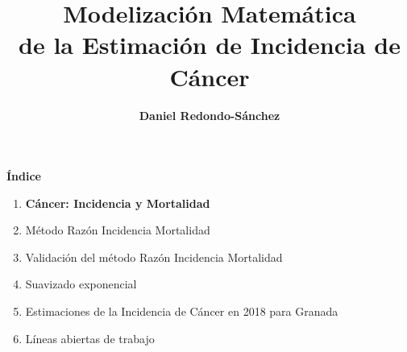 \documentclass{beamer}
\title[Modelización de la Estimación de Cáncer]{Modelización Matemática\\ de la Estimación de Incidencia de Cáncer} %
\author[Daniel Redondo-Sánchez]{\textbf{Daniel Redondo-Sánchez}}
\date[11 Julio 2019]{}
\institute[] %
{\scriptsize{
\vspace{10pt}
Máster Universitario en Matemáticas\\ Curso 2018/2019\\
\vspace{10pt}
Tutores: \newline \textbf{Francisco Javier Alonso Morales} \newline \textbf{Miguel Rodríguez Barranco}

}
\vspace{0pt}

\begin{columns}
	\begin{column}{0.17\textwidth}
		\begin{figure}
			\centering
			\texttt{[image: logos/mm.pdf]}
		\end{figure}
	\end{column}
	\begin{column}{0.5\textwidth}
		\begin{figure}
			\centering
			\texttt{[image: logos/logougr.png]}
		\end{figure}
	\end{column}
\end{columns}

}
\begin{document}
\begin{frame}
\titlepage %
\end{frame}



\begin{frame}\frametitle{}

\Large{\textbf{Índice}}\\[2ex]
\normalsize
\begin{enumerate}
	\item \textbf{Cáncer: Incidencia y Mortalidad} \\[2ex]
	\item Método Razón Incidencia Mortalidad \\[2ex]
	\item Validación del método Razón Incidencia Mortalidad \\[2ex]
	\item Suavizado exponencial \\[2ex]
	\item Estimaciones de la Incidencia de Cáncer en 2018 para Granada \\[2ex]
	\item Líneas abiertas de trabajo
\end{enumerate}

\end{frame}
\end{document}
